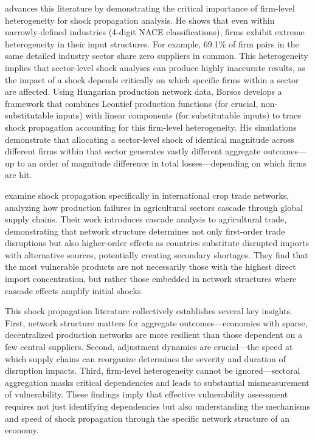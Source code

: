 \documentclass[final,1p,times,authoryear]{elsarticle}
\begin{document}
\cite{Borsos2021} advances this literature by demonstrating the critical importance of firm-level heterogeneity for shock propagation analysis. He shows that even within narrowly-defined industries (4-digit NACE classifications), firms exhibit extreme heterogeneity in their input structures. For example, 69.1\% of firm pairs in the same detailed industry sector share zero suppliers in common. This heterogeneity implies that sector-level shock analyses can produce highly inaccurate results, as the impact of a shock depends critically on which specific firms within a sector are affected. Using Hungarian production network data, Borsos develops a framework that combines Leontief production functions (for crucial, non-substitutable inputs) with linear components (for substitutable inputs) to trace shock propagation accounting for this firm-level heterogeneity. His simulations demonstrate that allocating a sector-level shock of identical magnitude across different firms within that sector generates vastly different aggregate outcomes—up to an order of magnitude difference in total losses—depending on which firms are hit.

\cite{Burkholz2019} examine shock propagation specifically in international crop trade networks, analyzing how production failures in agricultural sectors cascade through global supply chains. Their work introduces cascade analysis to agricultural trade, demonstrating that network structure determines not only first-order trade disruptions but also higher-order effects as countries substitute disrupted imports with alternative sources, potentially creating secondary shortages. They find that the most vulnerable products are not necessarily those with the highest direct import concentration, but rather those embedded in network structures where cascade effects amplify initial shocks.

This shock propagation literature collectively establishes several key insights. First, network structure matters for aggregate outcomes—economies with sparse, decentralized production networks are more resilient than those dependent on a few central suppliers. Second, adjustment dynamics are crucial—the speed at which supply chains can reorganize determines the severity and duration of disruption impacts. Third, firm-level heterogeneity cannot be ignored—sectoral aggregation masks critical dependencies and leads to substantial mismeasurement of vulnerability. These findings imply that effective vulnerability assessment requires not just identifying dependencies but also understanding the mechanisms and speed of shock propagation through the specific network structure of an economy.
\end{document}
